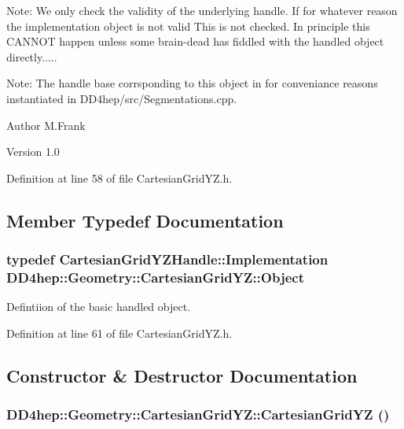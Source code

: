 Note: We only check the validity of the underlying handle. If for whatever reason the implementation object is not valid This is not checked. In principle this CANNOT happen unless some brain-\/dead has fiddled with the handled object directly.....

Note: The handle base corrsponding to this object in for conveniance reasons instantiated in DD4hep/src/Segmentations.cpp.

\begin{DoxyAuthor}{Author}
M.Frank 
\end{DoxyAuthor}
\begin{DoxyVersion}{Version}
1.0 
\end{DoxyVersion}


Definition at line 58 of file CartesianGridYZ.h.

\subsection{Member Typedef Documentation}
\hypertarget{class_d_d4hep_1_1_geometry_1_1_cartesian_grid_y_z_ad5db30e8623d30e9f23f0c4f8e0b546e}{
\subsubsection[{Object}]{\setlength{\rightskip}{0pt plus 5cm}typedef {\bf CartesianGridYZHandle::Implementation} {\bf DD4hep::Geometry::CartesianGridYZ::Object}}}
\label{class_d_d4hep_1_1_geometry_1_1_cartesian_grid_y_z_ad5db30e8623d30e9f23f0c4f8e0b546e}


Defintiion of the basic handled object. 

Definition at line 61 of file CartesianGridYZ.h.

\subsection{Constructor \& Destructor Documentation}
\hypertarget{class_d_d4hep_1_1_geometry_1_1_cartesian_grid_y_z_aed939b9098470846e32794f3d865ff7b}{
\subsubsection[{CartesianGridYZ}]{\setlength{\rightskip}{0pt plus 5cm}DD4hep::Geometry::CartesianGridYZ::CartesianGridYZ ()}}
\label{class_d_d4hep_1_1_geometry_1_1_cartesian_grid_y_z_aed939b9098470846e32794f3d865ff7b}


